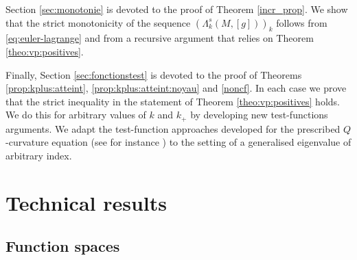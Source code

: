 \documentclass[10pt]{amsart}
\numberwithin{equation}{section}
\theoremstyle{plain}
\theoremstyle{remark}
\begin{document}
\medskip

Section \ref{sec:monotonie} is devoted to the proof of Theorem \ref{incr_prop}. We show that the strict monotonicity of the sequence $(\Lambda_k^s(M,[g]))_k$ follows from \eqref{eq:euler-lagrange} and from a recursive argument that relies on Theorem \ref{theo:vp:positives}. 

\medskip

Finally, Section \ref{sec:fonctionstest} is devoted to the proof of Theorems \ref{prop:kplus:atteint}, \ref{prop:kplus:atteint:noyau} and \ref{noncf}. In each case we prove that the strict inequality in the statement of Theorem \ref{theo:vp:positives} holds. We do this for arbitrary values of $k$ and $k_+$ by developing new test-functions arguments. We adapt the test-function approaches developed for the prescribed $Q$-curvature equation (see for instance \cite{MazumdarVetois}) to the setting of a generalised eigenvalue of arbitrary index. 



\section{Technical results} \label{sec:generalites} 


\subsection{Function spaces} \label{function_spaces}
\end{document}
